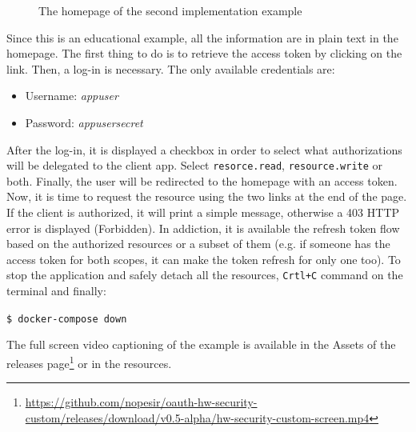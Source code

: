 \begin{figure}[h!]
    \centering
    \caption{The homepage of the second implementation example}
    \label{fig:home2}
\end{figure}

\noindent Since this is an educational example, all the information are in plain text in the homepage. The first thing to do is to retrieve the access token by clicking on the link. Then, a log-in is necessary. The only available credentials are:

\begin{itemize}
    \item Username: \textit{appuser}
    \item Password: \textit{appusersecret}
\end{itemize}

\noindent After the log-in, it is displayed a checkbox in order to select what authorizations will be delegated to the client app. Select \texttt{resorce.read}, \texttt{resource.write} or both. 
Finally, the user will be redirected to the homepage with an access token. Now, it is time to request the resource using the two links at the end of the page. If the client is authorized, it will print a simple message, otherwise a 403 HTTP error is displayed (Forbidden). In addiction, it is available the refresh token flow based on the authorized resources or a subset of them (e.g. if someone has the access token for both scopes, it can make the token refresh for only one too). To stop the application and safely detach all the resources, \texttt{Crtl+C} command on the terminal and finally:

  \texttt{\$ docker-compose down}

\noindent The full screen video captioning of the example is available in the Assets of the releases page\footnote{\scriptsize{\url{https://github.com/nopesir/oauth-hw-security-custom/releases/download/v0.5-alpha/hw-security-custom-screen.mp4}}} or in the resources. 

